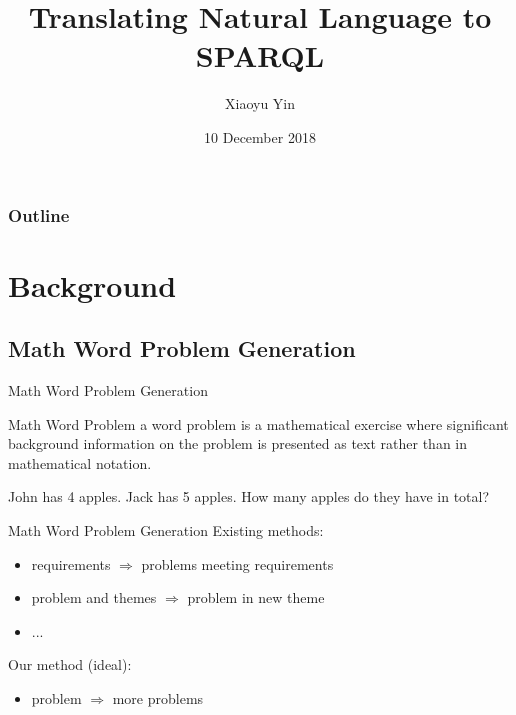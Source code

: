 \documentclass[11pt]{beamer}
\author{Xiaoyu Yin}
\title{Translating Natural Language to SPARQL}
\institute
{
International Center for Computational Logic\\
Technische Universität Dresden
}
\date{10 December 2018}
\begin{document}

\begin{frame}
    \titlepage
\end{frame}

\begin{frame}
    \frametitle{Outline}
    \tableofcontents[hideallsubsections]
\end{frame}

\section{Background}

\subsection{Math Word Problem Generation}
\begin{frame}{Math Word Problem Generation}
    \begin{block}{Math Word Problem}
        a word problem is a mathematical exercise where significant background information on the problem is presented as text rather than in mathematical notation.
    \end{block}
    \begin{example}
    John has 4 apples. Jack has 5 apples. How many apples do they have in total?
    \end{example}
\end{frame}

\begin{frame}{Math Word Problem Generation}
    Existing methods:
    \begin{itemize}
    \item requirements $\Rightarrow$ problems meeting requirements
    \item problem and themes $\Rightarrow$ problem in new theme
    \item ...
    \end{itemize}
    Our method (ideal):
    \begin{itemize}
    \item problem $\Rightarrow$ more problems
    \end{itemize}
\end{frame}
\end{document}

